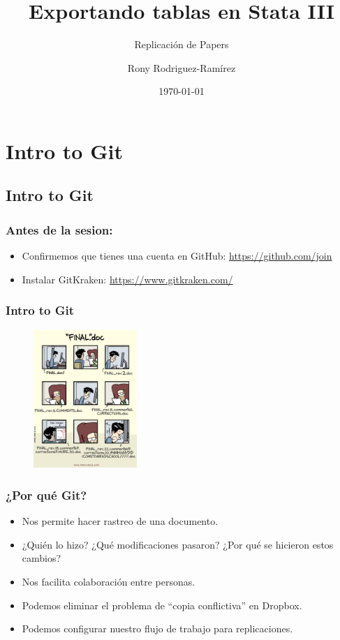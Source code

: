 \documentclass[10pt, aspectratio=169, compress]{beamer}
\title{Exportando tablas en Stata III}
\subtitle{Replicación de Papers}
\author{Rony Rodriguez-Ramírez}
\institute{LAMBDA}
\date{\today}
\begin{document}
\begin{frame}[plain]
	\maketitle 
\end{frame}
\section{Intro to Git}
\subsection{Intro to Git}
\begin{frame}
	\frametitle{Antes de la sesion:}

	\begin{itemize}
		\item Confirmemos que tienes una cuenta en GitHub: \hyperlink{https://github.com/join}{https://github.com/join}
		\item Instalar GitKraken: \hyperlink{https://www.gitkraken.com/}{https://www.gitkraken.com/}
	\end{itemize}
\end{frame}
\begin{frame}
	\frametitle{Intro to Git}	
	\begin{figure}[H]
		\centering
		\includegraphics[width=0.35\textwidth]{finaldoc.pdf}
	\end{figure}
\end{frame}
\begin{frame}
	\frametitle{¿Por qué Git?}

	\begin{itemize}
		\item Nos permite hacer rastreo de una documento. 
		\item ¿Quién lo hizo? ¿Qué modificaciones pasaron? ¿Por qué se hicieron estos cambios?
		\item Nos facilita colaboración entre personas.
		\item Podemos eliminar el problema de ``copia conflictiva'' en Dropbox. 
		\item Podemos configurar nuestro flujo de trabajo para replicaciones.
	\end{itemize}
\end{frame}
\end{document}
